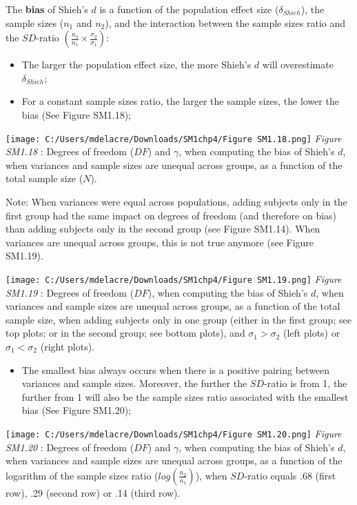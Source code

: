 \documentclass[
  english,
  man,mask,floatsintext]{apa6}
\providecommand{\tightlist}{%
  \setlength{\itemsep}{0pt}\setlength{\parskip}{0pt}}
\begin{document}
The \textbf{bias} of Shieh's \(d\) is a function of the population effect size (\(\delta_{Shieh}\)), the sample sizes (\(n_1\) and \(n_2\)), and the interaction between the sample sizes ratio and the \(SD\)-ratio \(\left(\frac{n_2}{n_1}\times\frac{\sigma_2}{\sigma_1} \right)\):

\begin{itemize}
\item
  The larger the population effect size, the more Shieh's \(d\) will overestimate \(\delta_{Shieh}\);
\item
  For a constant sample sizes ratio, the larger the sample sizes, the lower the bias (See Figure SM1.18);
\end{itemize}

\texttt{[image: C:/Users/mdelacre/Downloads/SM1chp4/Figure SM1.18.png]}
\emph{Figure SM1.18} : Degrees of freedom (\(DF\)) and \(\gamma\), when computing the bias of Shieh's \(d\), when variances and sample sizes are unequal across groups, as a function of the total sample size (\(N\)).

Note: When variances were equal across populations, adding subjects only in the first group had the same impact on degrees of freedom (and therefore on bias) than adding subjects only in the second group (see Figure SM1.14). When variances are unequal across groups, this is not true anymore (see Figure SM1.19).

\texttt{[image: C:/Users/mdelacre/Downloads/SM1chp4/Figure SM1.19.png]}
\emph{Figure SM1.19} : Degrees of freedom (\(DF\)), when computing the bias of Shieh's \(d\), when variances and sample sizes are unequal across groups, as a function of the total sample size, when adding subjects only in one group (either in the first group; see top plots; or in the second group; see bottom plots), and \(\sigma_1 > \sigma_2\) (left plots) or \(\sigma_1 < \sigma_2\) (right plots).

\begin{itemize}
\tightlist
\item
  The smallest bias always occurs when there is a positive pairing between variances and sample sizes. Moreover, the further the \(SD\)-ratio is from 1, the further from 1 will also be the sample sizes ratio associated with the smallest bias (See Figure SM1.20);
\end{itemize}

\texttt{[image: C:/Users/mdelacre/Downloads/SM1chp4/Figure SM1.20.png]}
\emph{Figure SM1.20} : Degrees of freedom (\(DF\)) and \(\gamma\), when computing the bias of Shieh's \(d\), when variances and sample sizes are unequal across groups, as a function of the logarithm of the sample sizes ratio (\(log \left( \frac{n_2}{n_1} \right)\)), when \(SD\)-ratio equals .68 (first row), .29 (second row) or .14 (third row).
\end{document}
